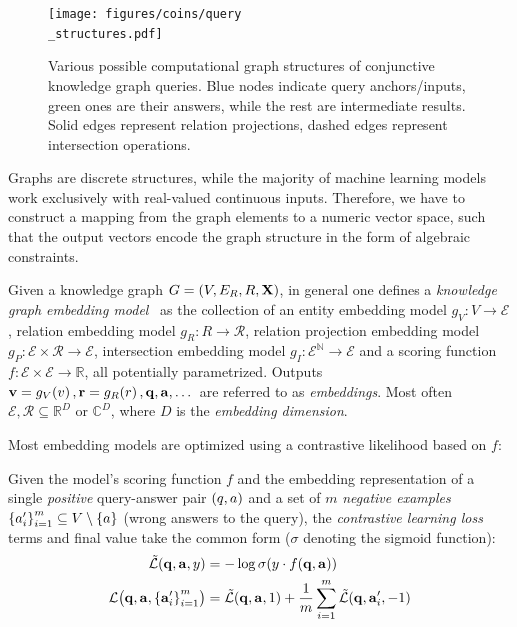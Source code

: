 \begin{figure}[H]
    \centering
    \texttt{[image: figures/coins/query\\\_structures.pdf]}
    \caption[Various possible computational graph structures of conjunctive knowledge graph queries.]{Various possible computational graph structures of conjunctive knowledge graph queries. Blue nodes indicate query anchors/inputs, green ones are their answers, while the rest are intermediate results. Solid edges represent relation projections, dashed edges represent intersection operations.}
    \label{fig:query_structures}
\end{figure}

Graphs are discrete structures, while the majority of machine learning models work exclusively with real-valued continuous inputs. Therefore, we have to construct a mapping from the graph elements to a numeric vector space, such that the output vectors encode the graph structure in the form of algebraic constraints.
\begin{definition}
Given a knowledge graph $G = \mathopen{}\left(V, E_R, R, \mathbf{X}\right)$, in general one defines a \textit{knowledge graph embedding model}~\cite{ji_survey_2022,liang_survey_2024,ren_query2box_2020} as the collection of an entity embedding model $g_V: V \to \mathcal{E}$, relation embedding model $g_R: R \to \mathcal{R}$, relation projection embedding model $g_P: \mathcal{E} \times \mathcal{R} \to \mathcal{E}$, intersection embedding model $g_I: \mathcal{\mathcal{E}}^{\mathbb{N}} \to \mathcal{E}$ and a scoring function $f: \mathcal{E} \times \mathcal{E} \to \mathbb{R}$, all potentially parametrized. Outputs $\mathbf{v} = g_V\mathopen{}\left(v\right), \mathbf{r} = g_R\mathopen{}\left(r\right), \mathbf{q}, \mathbf{a}, \dots$ are referred to as \emph{embeddings}. Most often $\mathcal{E}, \mathcal{R} \subseteq \mathbb{R}^D$ or $\mathbb{C}^D$, where $D$ is the \emph{embedding dimension}. 
\end{definition}

Most embedding models are optimized using a contrastive likelihood based on $f$:
\begin{definition}
\label{def:contrastive_loss}
    Given the model's scoring function $f$ and the embedding representation of a single \emph{positive} query-answer pair $\mathopen{}\left(q, a\right)$ and a set of $m$ \emph{negative examples} $\mathopen{}\left\{a'_i\right\}_{i=1}^{m} \subseteq V \setminus \mathopen{}\left\{a\right\}$ (wrong answers to the query), the \emph{contrastive learning loss} terms and final value take the common form ($\sigma$ denoting the sigmoid function):
    \begin{align}
    \begin{split}
    \label{eq:contrastive_loss}
        \tilde{\mathcal{L}}\mathopen{}\left(\mathbf{q}, \mathbf{a}, y\right)&=-\log{\sigma{\mathopen{}\left(y \cdot f\mathopen{}\left(\mathbf{q},\mathbf{a}\right)\right)}}\\
        \mathcal{L}\mathopen{}\left(\mathbf{q}, \mathbf{a}, \mathopen{}\left\{\mathbf{a}'_i\right\}_{i=1}^{m}\right)&=\tilde{\mathcal{L}}\mathopen{}\left(\mathbf{q}, \mathbf{a}, 1\right) + \frac{1}{m}\sum_{i=1}^{m}{\tilde{\mathcal{L}}\mathopen{}\left(\mathbf{q}, \mathbf{a}'_i, -1\right)}
        \end{split}
    \end{align}
\end{definition}

